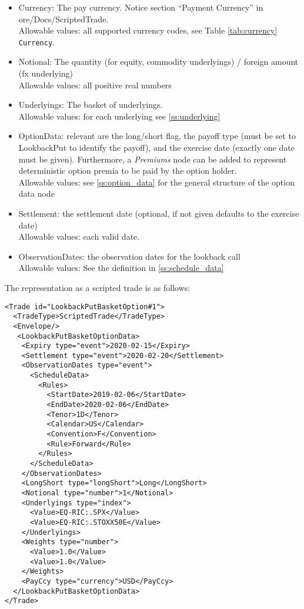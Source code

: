 \begin{itemize}
\item Currency: The pay currency. Notice section ``Payment Currency'' in ore/Docs/ScriptedTrade. \\
  Allowable values: all supported currency codes, see Table \ref{tab:currency} \lstinline!Currency!.
\item Notional: The quantity (for equity, commodity underlyings) / foreign amount (fx underlying) \\
  Allowable values: all positive real numbers
\item Underlyings: The basket of underlyings. \\
  Allowable values: for each underlying see \ref{ss:underlying}
\item OptionData: relevant are the long/short flag, the payoff type (must be set to LookbackPut to
  identify the payoff), and the exercise date (exactly one date must be given). Furthermore, a \emph{Premiums} node can be added to represent deterministic option premia to be paid by the option holder. \\
  Allowable values: see \ref{ss:option_data} for the general structure of the option data node
\item Settlement: the settlement date (optional, if not given defaults to the exercise date) \\
  Allowable values: each valid date.
\item ObservationDates: the observation dates for the lookback call \\
  Allowable values: See the definition in \ref{ss:schedule_data}
\end{itemize}

The representation as a scripted trade is as follows:

\begin{verbatim}
<Trade id="LookbackPutBasketOption#1">
  <TradeType>ScriptedTrade</TradeType>
  <Envelope/>
   <LookbackPutBasketOptionData>
    <Expiry type="event">2020-02-15</Expiry>
    <Settlement type="event">2020-02-20</Settlement>
    <ObservationDates type="event">
      <ScheduleData>
        <Rules>
          <StartDate>2019-02-06</StartDate>
          <EndDate>2020-02-06</EndDate>
          <Tenor>1D</Tenor>
          <Calendar>US</Calendar>
          <Convention>F</Convention>
          <Rule>Forward</Rule>
        </Rules>
      </ScheduleData>
    </ObservationDates>
    <LongShort type="longShort">Long</LongShort>
    <Notional type="number">1</Notional>
    <Underlyings type="index">
      <Value>EQ-RIC:.SPX</Value>
      <Value>EQ-RIC:.STOXX50E</Value>
    </Underlyings>
    <Weights type="number">
      <Value>1.0</Value>
      <Value>1.0</Value>
    </Weights>
    <PayCcy type="currency">USD</PayCcy>
  </LookbackPutBasketOptionData>
</Trade>
\end{verbatim}

